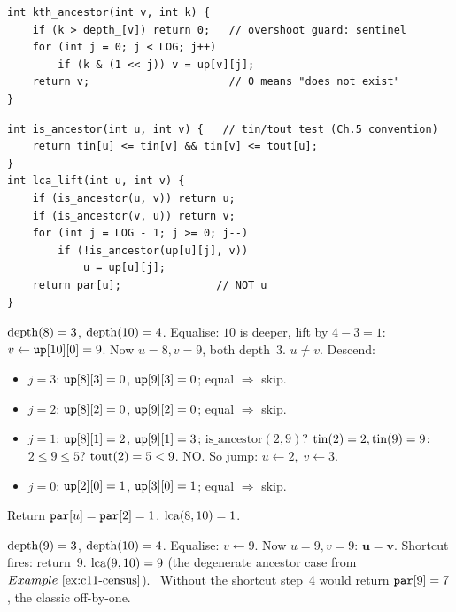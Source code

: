 \begin{lstlisting}[caption={k-th ancestor via bit decomposition}, label={lst:c11-climb}]
int kth_ancestor(int v, int k) {
    if (k > depth_[v]) return 0;   // overshoot guard: sentinel
    for (int j = 0; j < LOG; j++)
        if (k & (1 << j)) v = up[v][j];
    return v;                      // 0 means "does not exist"
}
\end{lstlisting}

\begin{lstlisting}[caption={LCA by descending pairs -- the contest default}, label={lst:c11-lcalift}]
int is_ancestor(int u, int v) {   // tin/tout test (Ch.5 convention)
    return tin[u] <= tin[v] && tin[v] <= tout[u];
}
int lca_lift(int u, int v) {
    if (is_ancestor(u, v)) return u;
    if (is_ancestor(v, u)) return v;
    for (int j = LOG - 1; j >= 0; j--)
        if (!is_ancestor(up[u][j], v))
            u = up[u][j];
    return par[u];               // NOT u
}
\end{lstlisting}

\begin{tracebox}
\(\operatorname{depth}(8) = 3\), \(\operatorname{depth}(10) = 4\).  Equalise: \(10\) is deeper, lift
by \(4-3=1\): \(v \leftarrow \texttt{up}[10][0] = 9\).  Now \(u=8, v=9\),
both depth~3.  \(u \ne v\).  Descend:
\begin{itemize}[nosep]
  \item \(j=3\): \(\texttt{up}[8][3] = 0\), \(\texttt{up}[9][3] = 0\);
        equal \(\Rightarrow\) skip.
  \item \(j=2\): \(\texttt{up}[8][2] = 0\), \(\texttt{up}[9][2] = 0\);
        equal \(\Rightarrow\) skip.
  \item \(j=1\): \(\texttt{up}[8][1] = 2\), \(\texttt{up}[9][1] = 3\);
        \(\text{is\_ancestor}(2, 9)\)?  \(\operatorname{tin}(2)=2, \operatorname{tin}(9)=9\):
        \(2 \le 9 \le 5\)?  \(\operatorname{tout}(2)=5 < 9\).  NO.  So jump:
        \(u \leftarrow 2,\; v \leftarrow 3\).
  \item \(j=0\): \(\texttt{up}[2][0] = 1\), \(\texttt{up}[3][0] = 1\);
        equal \(\Rightarrow\) skip.
\end{itemize}
Return \(\texttt{par}[u] = \texttt{par}[2] = 1\).  \(\operatorname{lca}(8,10)=1\).  \checkmark
\end{tracebox}

\begin{tracebox}
\(\operatorname{depth}(9) = 3\), \(\operatorname{depth}(10) = 4\).  Equalise: \(v \leftarrow 9\).
Now \(u=9, v=9\): \(\mathbf{u = v}\).  Shortcut fires: return~9.
\(\operatorname{lca}(9,10) = 9\) (the degenerate ancestor case from
\(\exref{c11-census}\)).  \checkmark\ Without the shortcut step~4 would
return \(\texttt{par}[9] = 7\), the classic off-by-one.
\end{tracebox}

